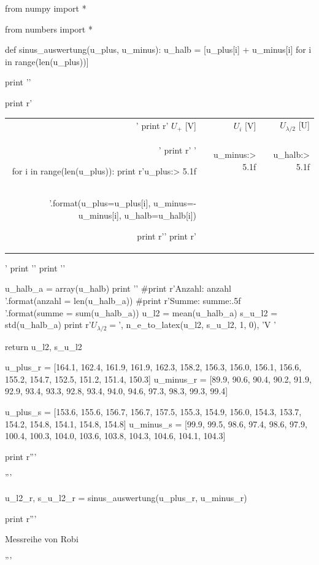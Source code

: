 \begin{python}
from numpy import *

from numbers import *

def sinus_auswertung(u_plus, u_minus):
  u_halb = [u_plus[i] + u_minus[i] for i in range(len(u_plus))]

  print '\n'

  print r'\begin{tabular}{rrr} \toprule'
  print r' $U_+$ [V] & $U_i$ [V] & $U_{\lambda/2}$ [U] \\'
  print r' \midrule '

  for i in range(len(u_plus)):
    print r'{u_plus:> 5.1f}&{u_minus:> 5.1f}&{u_halb:> 5.1f}\\'.format(u_plus=u_plus[i], u_minus=-u_minus[i], u_halb=u_halb[i])

  print r'\bottomrule '
  print r'\end{tabular}'
  print '\n'
  print '\n'

  u_halb_a = array(u_halb)
  print '\n'
  #print r'Anzahl: {anzahl} \\'.format(anzahl = len(u_halb_a))
  #print r'Summe: {summe:.5f}\\'.format(summe = sum(u_halb_a))
  u_l2 = mean(u_halb_a)
  s_u_l2 = std(u_halb_a)
  print r'$U_{\lambda/2} = $', n_e_to_latex(u_l2, s_u_l2, 1, 0), 'V \n' 
  
  return u_l2, s_u_l2

  

u_plus_r  = [164.1, 162.4, 161.9, 161.9, 162.3, 158.2, 156.3, 156.0, 156.1, 156.6, 155.2, 154.7, 152.5, 151.2, 151.4, 150.3]
u_minus_r = [89.9, 90.6, 90.4, 90.2, 91.9, 92.9, 93.4, 93.3, 92.8, 93.4, 94.0, 94.6, 97.3, 98.3, 99.3, 99.4]

u_plus_s = [153.6, 155.6, 156.7, 156.7, 157.5, 155.3, 154.9, 156.0, 154.3, 153.7, 154.2, 154.8, 154.1, 154.8, 154.8]
u_minus_s = [99.9, 99.5, 98.6, 97.4, 98.6, 97.9, 100.4, 100.3, 104.0, 103.6, 103.8, 104.3, 104.6, 104.1, 104.3]  


print r'''\begin{table}[H]
\begin{minipage}[b]{0.5\linewidth}
\centering
         '''

u_l2_r, s_u_l2_r = sinus_auswertung(u_plus_r, u_minus_r)

print r'''  \caption{Messreihe von Robi}
	  \end{minipage}
	  \begin{minipage}[b]{0.5\linewidth}
	    \centering
           '''


\end{minipage}
\end{table}
\end{python}
